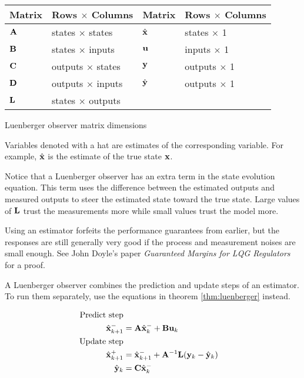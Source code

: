 \begin{booktable}
  \begin{tabular}{|ll|ll|}
    \hline
    \rowcolor{headingbg}
    \textbf{Matrix} & \textbf{Rows $\times$ Columns} &
    \textbf{Matrix} & \textbf{Rows $\times$ Columns} \\
    \hline
    $\mathbf{A}$ & states $\times$ states & $\hat{\mathbf{x}}$ & states $\times$ 1 \\
    $\mathbf{B}$ & states $\times$ inputs & $\mathbf{u}$ & inputs $\times$ 1 \\
    $\mathbf{C}$ & outputs $\times$ states & $\mathbf{y}$ & outputs $\times$ 1 \\
    $\mathbf{D}$ & outputs $\times$ inputs & $\hat{\mathbf{y}}$ & outputs $\times$ 1 \\
    $\mathbf{L}$ & states $\times$ outputs & & \\
    \hline
  \end{tabular}
  \caption{Luenberger observer matrix dimensions}
  \label{tab:luenberger_matrix_dims}
\end{booktable}

Variables denoted with a hat are estimates of the corresponding variable. For
example, $\hat{\mathbf{x}}$ is the estimate of the true state $\mathbf{x}$.

Notice that a Luenberger observer has an extra term in the state evolution
equation. This term uses the difference between the estimated outputs and
measured outputs to steer the estimated state toward the true state. Large
values of $\mathbf{L}$ trust the measurements more while small values trust the
model more.

\begin{remark}
  Using an estimator forfeits the performance guarantees from earlier, but the
  responses are still generally very good if the process and measurement noises
  are small enough. See John Doyle's paper \textit{Guaranteed Margins for LQG
  Regulators} for a proof.
\end{remark}

A Luenberger observer combines the prediction and update steps of an estimator.
To run them separately, use the equations in theorem \ref{thm:luenberger}
instead.

\begin{theorem}
  \begin{align}
    \text{Predict step} \nonumber \\
    \hat{\mathbf{x}}_{k+1}^- &= \mathbf{A}\hat{\mathbf{x}}_k^- + \mathbf{B}\mathbf{u}_k \\
    \text{Update step} \nonumber \\
    \hat{\mathbf{x}}_{k+1}^+ &= \hat{\mathbf{x}}_{k+1}^- + \mathbf{A}^{-1}\mathbf{L}
      (\mathbf{y}_k - \hat{\mathbf{y}}_k) \\
    \hat{\mathbf{y}}_k &= \mathbf{C} \hat{\mathbf{x}}_k^-
  \end{align}
  \label{thm:luenberger}
\end{theorem}

